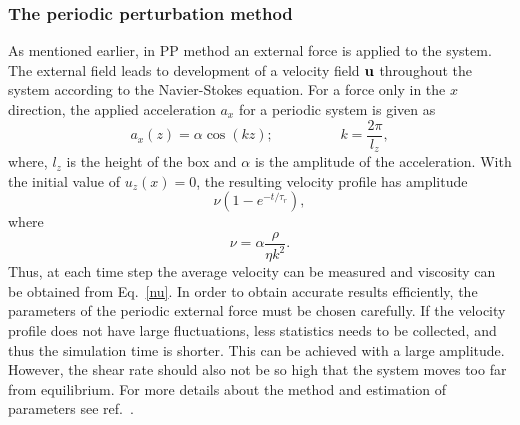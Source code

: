 \documentclass[preprint,pre,aps,superscriptaddress,a4paper]{revtex4}
\begin{document}
\subsubsection{The periodic perturbation method }
As mentioned earlier, in PP method an external force is applied to the system. The external field leads to development of a velocity field $\bold {u}$  throughout the system according to the Navier-Stokes equation.
For a force only in the $x$ direction, the applied acceleration $a_x$ for a periodic system is given as
\begin{equation}
a_x(z)= \alpha  \cos(kz); \hspace{2cm} k=\frac{2 \pi}{l_z},
\end{equation}
where, $l_z$ is the height of the box and $\alpha$ is the amplitude of the acceleration. With the initial value of $u_z(x)=0$, the resulting  velocity profile has amplitude  
\begin{equation}
\nu (1-e^{-t/\tau_r}),
\end{equation}
where 
\begin{equation}
\nu=\alpha \frac{\rho}{\eta k^2}.
\label{nu}
\end{equation}
Thus, at each time step the average velocity can be measured and viscosity can be obtained from Eq.~\ref{nu}.
In order to obtain accurate results efficiently, the parameters of the periodic external force must be chosen carefully. 
If the velocity profile does not have large fluctuations, less statistics needs to be collected, and thus the simulation time is shorter.
This can be achieved with a large amplitude.
However, the shear rate should also not be so high that the system moves too far from equilibrium. For more details about the method and estimation of parameters see ref.~\cite{hess:02:0}.
\end{document}
